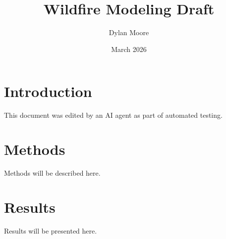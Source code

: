 \documentclass{article}
\title{Wildfire Modeling Draft}
\author{Dylan Moore}
\date{March 2026}
\begin{document}
\maketitle

\section{Introduction}
This document was edited by an AI agent as part of automated testing.

\section{Methods}
Methods will be described here.

\section{Results}
Results will be presented here.
\end{document}
